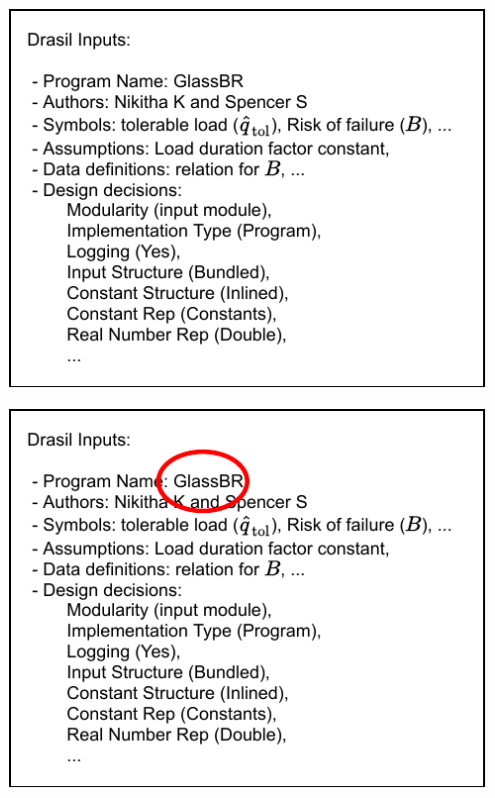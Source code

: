 \documentclass{beamer}
\begin{document}

\begin{frame}


\includegraphics[width=0.95\textwidth]{../figures/DrasilInputs.pdf}

\end{frame}


\begin{frame}


\includegraphics[width=0.95\textwidth]{../figures/InputsCircleGlassBR.pdf}

\end{frame}
\end{document}
